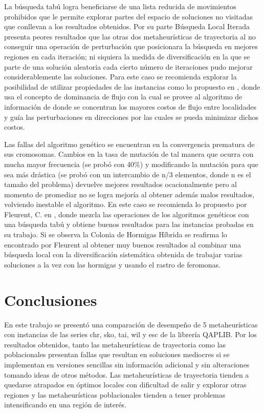 \documentclass{ci5652}
\begin{document}
La búsqueda tabú logra beneficiarse de una lista reducida de movimientos prohibidos que le permite explorar partes del espacio de soluciones no visitadas que conllevan a los resultados obtenidos. Por su parte Búsqueda Local Iterada presenta peores resultados que las otras dos metaheurísticas de trayectoria al no conseguir una operación de perturbación que posicionara la búsqueda en mejores regiones en cada iteración; ni siquiera la medida de diversificación en la que se parte de una solución aleatoria cada cierto número de iteraciones pudo mejorar considerablemente las soluciones. Para este caso se recomienda explorar la posibilidad de utilizar propiedades de las instancias como  lo propuesto en \cite{14}, donde usa el concepto de dominancia de flujo con la cual se provee al algoritmo de información de donde se concentran los mayores costos de flujo entre localidades y guía las perturbaciones en direcciones por las cuales se pueda minimizar dichos costos.

Las fallas del algoritmo genético se encuentran en la convergencia prematura de sus cromosomas. Cambios en la tasa de mutación de tal manera que ocurra con mucha mayor frecuencia (se probó con 40\%) y modificando la mutación para que sea más drástica (se probó con un intercambio de n/3 elementos, donde n es el tamaño del problema) devuelve mejores resultados ocacionalmente pero al momento de promediar no se logra mejoría al obtener además malos resultados, volviendo inestable el algoritmo. En este caso se recomienda lo propuesto por Fleurent, C. en \cite{16}, donde mezcla las operaciones de los algoritmos genéticos con una búsqueda tabú y obtiene buenos resultados para las instancias probadas en su trabajo. Si se observa la Colonia de Hormigas Híbrida se reafirma lo encontrado por Fleurent al obtener muy buenos resultados al combinar una búsqueda local con la diversificación sistemática obtenida de trabajar varias soluciones a la vez con las hormigas y usando el rastro de feromonas. 


\section*{Conclusiones}

En este trabajo se presentó una comparación de desempeño de 5 metaheurísticas con instancias de las series chr, sko, tai, wil y esc de la librería QAPLIB. Por los resultados obtenidos, tanto las metaheurísticas de trayectoria como las poblacionales presentan fallas que resultan en soluciones mediocres si se implementan en versiones sencillas sin información adicional y sin alteraciones tomando ideas de otros métodos. Las metaheurísticas de trayectoria tienden a quedarse atrapados en óptimos locales con dificultad de salir y explorar otras regiones y las metaheurísticas poblacionales tienden a tener problemas intensificando en una región de interés.
\end{document}
